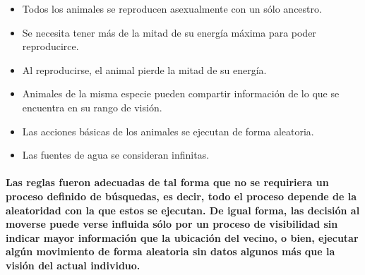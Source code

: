 \begin{itemize}
      \item{Todos los animales se reproducen asexualmente con un sólo ancestro.}
      \item{Se necesita tener más de la mitad de su energía máxima para poder reproducirce.}
      \item{Al reproducirse, el animal pierde la mitad de su energía.}
      \item{Animales de la misma especie pueden compartir información de lo que se encuentra en su rango de visión.}
      \item{Las acciones básicas de los animales se ejecutan de forma aleatoria.}
      \item{Las fuentes de agua se consideran infinitas.}
    \end{itemize}
  \paragraph{Las reglas fueron adecuadas de tal forma que no se requiriera un proceso definido de búsquedas, es decir, todo el proceso depende de la aleatoridad con la que estos se ejecutan. De igual forma, las decisión al moverse puede verse influida sólo por un proceso de visibilidad sin indicar mayor información que la ubicación del vecino, o bien, ejecutar algún movimiento de forma aleatoria sin datos algunos más que la visión del actual individuo.}
